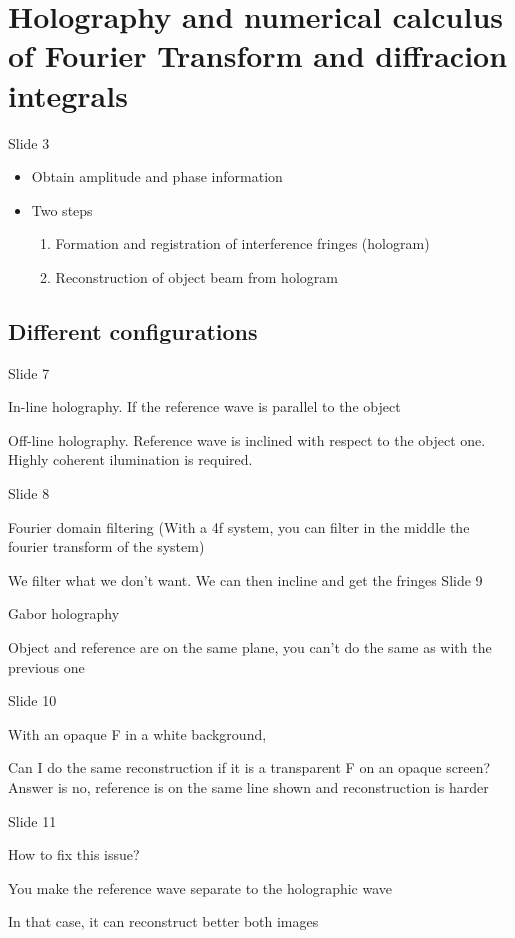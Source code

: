 \documentclass[../main/main.tex]{subfiles}
\begin{document}
\chapter{Holography and numerical calculus of Fourier Transform and diffracion integrals}
Slide 3

\begin{itemize}
	\item Obtain amplitude and phase information
	\item Two steps
	      \begin{enumerate}
		      \item Formation and registration of interference fringes (hologram)
		      \item Reconstruction of object beam from hologram
	      \end{enumerate}

\end{itemize}


\section{Different configurations}

Slide 7

In-line holography. If the reference wave is parallel to the object

Off-line holography. Reference wave is inclined with respect to the object one. Highly coherent ilumination is required.


Slide 8


Fourier domain filtering (With a 4f system, you can filter in the middle the fourier transform of the system)

We filter what we don't want. We can then incline and get the fringes
Slide 9

Gabor holography

Object and reference are on the same plane, you can't do the same as with the previous one


Slide 10

With an opaque F in a white background,

Can I do the same reconstruction if it is a transparent F on an opaque screen?
Answer is no, reference is on the same line shown and reconstruction is harder

Slide 11

How to fix this issue?

You make the reference wave separate to the holographic wave

In that case, it can reconstruct better both images
\end{document}
